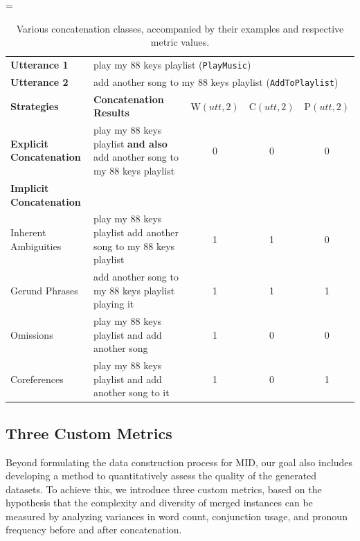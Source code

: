 \begin{table}
    \scriptsize
    \centering
    \extrarowheight=\aboverulesep
    \addtolength{\extrarowheight}{\belowrulesep}
    \aboverulesep=0pt
    \belowrulesep=0pt
    \begin{tabular}{l b c c c}
        \toprule
            \textbf{Utterance 1} & \multicolumn{4}{b}{play my 88 keys playlist (\texttt{PlayMusic})} \\
            \textbf{Utterance 2} & \multicolumn{4}{b}{add another song to my 88 keys playlist (\texttt{AddToPlaylist})} \\ 
        \bottomrule
        \toprule
            \textbf{Strategies }& \textbf{Concatenation Results} & $\mathrm{W}(utt, 2)$ & $\mathrm{C}(utt, 2)$ & $\mathrm{P}(utt, 2)$ \\
        \midrule
            \textbf{Explicit Concatenation} & play my 88 keys playlist \textbf{and also} add another song to my 88 keys playlist & 0 & 0 & 0 \\
        \midrule
            \textbf{Implicit Concatenation} & & & & \\ 
            Inherent Ambiguities & play my 88 keys playlist add another song to my 88 keys playlist & 1 & 1 & 0 \\ 
            Gerund Phrases & add another song to my 88 keys playlist playing it  & 1 & 1 & 1 \\ 
            Omissions & play my 88 keys playlist and add another song & 1 & 0 & 0 \\ 
            Coreferences & play my 88 keys playlist and add another song to it & 1 & 0 & 1 \\ 
        \bottomrule
    \end{tabular}
    \caption{Various concatenation classes, accompanied by their examples and respective metric values.}
    \centering
    \label{table:concat_and_metrics}
\end{table}

\subsection{Three Custom Metrics} \label{subsec:metric}
Beyond formulating the data construction process for MID, our goal also includes developing a method to quantitatively assess the quality of the generated datasets.
To achieve this, we introduce three custom metrics, based on the hypothesis that the complexity and diversity of merged instances can be measured by analyzing variances in word count, conjunction usage, and pronoun frequency before and after concatenation.

